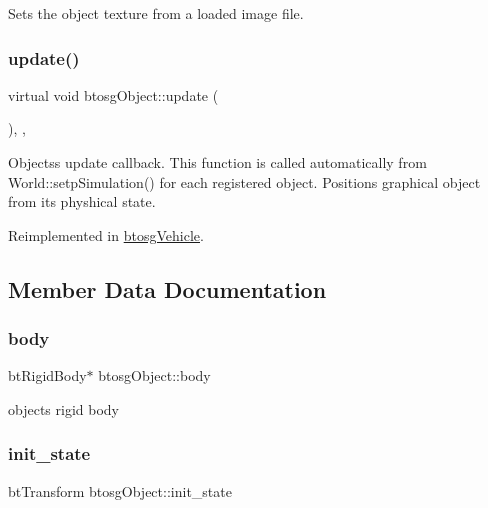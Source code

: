 Sets the object texture from a loaded image file. \mbox{\label{classbtosgObject_a342917817dfde62554f83da8e0d5110b}} 
\subsubsection{\texorpdfstring{update()}{update()}}
{\footnotesize\ttfamily virtual void btosg\+Object\+::update (\begin{DoxyParamCaption}{ }\end{DoxyParamCaption})\hspace{0.3cm}{\ttfamily [inline]}, {\ttfamily [virtual]}, {\ttfamily [inherited]}}

Objects\textquotesingle{}s update callback. This function is called automatically from World\+::setp\+Simulation() for each registered object. Positions graphical object from its physhical state. 

Reimplemented in \hyperlink{classbtosgVehicle_a5fd0f471df492ac232c9b772a28bd2b9}{btosg\+Vehicle}.



\subsection{Member Data Documentation}
\mbox{\label{classbtosgObject_a64ccde0543c184ed1749fdb9c9699785}} 
\subsubsection{\texorpdfstring{body}{body}}
{\footnotesize\ttfamily bt\+Rigid\+Body$\ast$ btosg\+Object\+::body\hspace{0.3cm}{\ttfamily [inherited]}}



object\textquotesingle{}s rigid body 

\mbox{\label{classbtosgObject_a2dee023f311114e200df9b04c8c1b400}} 
\subsubsection{\texorpdfstring{init\+\_\+state}{init\_state}}
{\footnotesize\ttfamily bt\+Transform btosg\+Object\+::init\+\_\+state\hspace{0.3cm}{\ttfamily [inherited]}}



